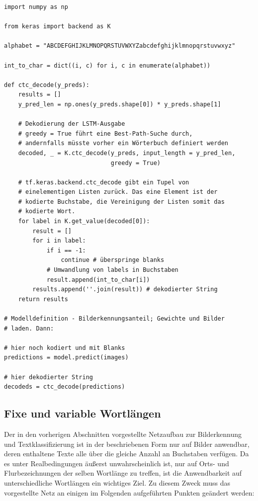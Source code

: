 \begin{code}
\begin{verbatim}
import numpy as np

from keras import backend as K

alphabet = "ABCDEFGHIJKLMNOPQRSTUVWXYZabcdefghijklmnopqrstuvwxyz"

int_to_char = dict((i, c) for i, c in enumerate(alphabet))

def ctc_decode(y_preds):
    results = []
    y_pred_len = np.ones(y_preds.shape[0]) * y_preds.shape[1]

    # Dekodierung der LSTM-Ausgabe
    # greedy = True führt eine Best-Path-Suche durch,
    # andernfalls müsste vorher ein Wörterbuch definiert werden
    decoded, _ = K.ctc_decode(y_preds, input_length = y_pred_len,
                              greedy = True)

    # tf.keras.backend.ctc_decode gibt ein Tupel von
    # einelementigen Listen zurück. Das eine Element ist der
    # kodierte Buchstabe, die Vereinigung der Listen somit das
    # kodierte Wort.
    for label in K.get_value(decoded[0]):
        result = []
        for i in label:
            if i == -1:
                continue # überspringe blanks
            # Umwandlung von labels in Buchstaben
            result.append(int_to_char[i])
        results.append(''.join(result)) # dekodierter String
    return results

# Modelldefinition - Bilderkennungsanteil; Gewichte und Bilder
# laden. Dann:

# hier noch kodiert und mit Blanks
predictions = model.predict(images)

# hier dekodierter String
decodeds = ctc_decode(predictions)
\end{verbatim}
\label{daten:textklassifizierung:inferenz}
\end{code}

\subsection{Fixe und variable Wortlängen}
\label{daten:wortlaenge}

Der in den vorherigen Abschnitten vorgestellte Netzaufbau zur Bilderkennung und Textklassifizierung ist in der
beschriebenen Form nur auf Bilder anwendbar, deren enthaltene Texte alle über die gleiche Anzahl an Buchstaben
verfügen. Da es unter Realbedingungen äußerst unwahrscheinlich ist, nur auf Orts- und Flurbezeichnungen der selben
Wortlänge zu treffen, ist die Anwendbarkeit auf unterschiedliche Wortlängen ein wichtiges Ziel. Zu diesem Zweck muss
das vorgestellte Netz an einigen im Folgenden aufgeführten Punkten geändert werden:

